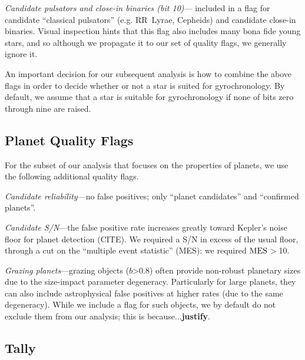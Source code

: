 \documentclass[11pt,twocolumn,tighten]{aastex63}
\begin{document}
{\it Candidate pulsators and close-in binaries (bit
10)}---\citeauthor{Santos_2021} included in a flag for candidate
``classical pulsators'' (e.g. RR~Lyrae, Cepheids) and candidate
close-in binaries.  Visual inspection hints that this flag also
includes many bona fide young stars, and so although we propagate it 
to our set of quality flags, we generally ignore it.

An important decision for our subsequent analysis is how to combine
the above flags in order to decide whether or not a star is suited for
gyrochronology.  By default, we assume that a star is suitable for
gyrochronology if none of bits zero through nine are raised.


\subsection{Planet Quality Flags}
\label{subsec:plflags}
For the subset of our analysis that focuses on the properties of
planets, we use the following additional quality flags.

{\it Candidate reliability}---no false positives; only ``planet
candidates'' and ``confirmed planets''.

{\it Candidate S/N}---the false positive rate increases greatly toward
Kepler's noise floor for planet detection (CITE).  We required a S/N
in excess of the usual floor, through a cut on the ``multiple event
statistic'' (MES): we required ${\rm MES}$$>$10.

{\it Grazing planets}---grazing objects ($b$>0.8) often provide
non-robust planetary sizes due to the size-impact parameter
degeneracy.  Particularly for large planets, they can also include
astrophysical false positives at higher rates (due to the same
degeneracy).  While we include a flag for such objects, we by default
do not exclude them from our analysis; this is because...{\bf justify}.

\subsection{Tally}
\label{subsec:tally}
\end{document}
